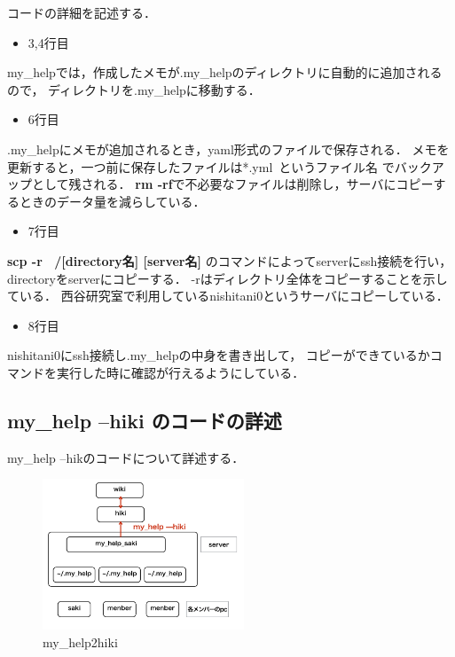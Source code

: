 コードの詳細を記述する．
\begin{itemize}
\item 3,4行目
\end{itemize}
\begin{description}
\item my\_helpでは，作成したメモが.my\_helpのディレクトリに自動的に追加されるので，
ディレクトリを.my\_helpに移動する．
\end{description}
\begin{itemize}
\item 6行目
\end{itemize}
\begin{description}
\item .my\_helpにメモが追加されるとき，yaml形式のファイルで保存される．
メモを更新すると，一つ前に保存したファイルは*.yml~というファイル名
でバックアップとして残される．
\textbf{rm -rf}で不必要なファイルは削除し，サーバにコピーするときのデータ量を減らしている．
\end{description}

\begin{itemize}
\item 7行目
\end{itemize}
\begin{description}
\item
\textbf{scp -r ~/[directory名] [server名]}
のコマンドによってserverにssh接続を行い，directoryをserverにコピーする．
-rはディレクトリ全体をコピーすることを示している．
西谷研究室で利用しているnishitani0というサーバにコピーしている．
\end{description}

\begin{itemize}
\item 8行目
\end{itemize}
\begin{description}
\item nishitani0にssh接続し.my\_helpの中身を書き出して，
コピーができているかコマンドを実行した時に確認が行えるようにしている．
\end{description}

\newpage

\subsection{my\_help --hiki のコードの詳述}
my\_help --hikのコードについて詳述する．

\begin{figure}[htbp]\begin{center}
\includegraphics[width=6cm,bb=100 100 600 800]{my_help2hiki_saki.013.png}
\caption{my\_help2hiki}
\label{default}\end{center}\end{figure}

